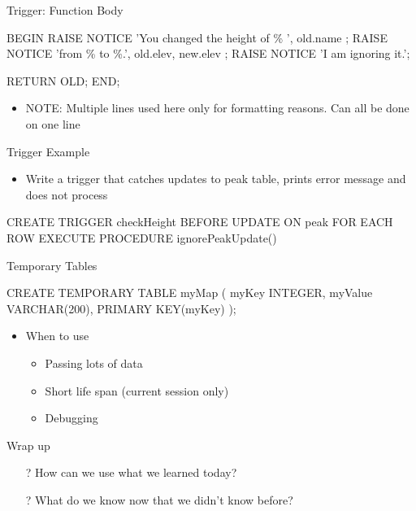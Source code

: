 \documentclass[aspectratio=169]{beamer}
\newenvironment{noindentitemize}
{ \begin{itemize}
 \setlength{\itemsep}{1.5ex}
  \setlength{\parsep}{0pt}   
  \setlength{\parskip}{0pt}
 \addtolength{\leftskip}{-2em}
 }
{ \end{itemize} }
\begin{document}

\begin{frame}[fragile]{Trigger: Function Body}


\begin{SQL}
BEGIN
   RAISE NOTICE 'You changed the height of \% ', old.name ;
   RAISE NOTICE 'from \% to \%.', old.elev, new.elev ;
   RAISE NOTICE 'I am ignoring it.';

   RETURN OLD;
END;
\end{SQL}

\begin{noindentitemize}
	\item NOTE: Multiple lines used here only for formatting reasons. Can all be done on one line
\end{noindentitemize}


\end{frame}


\begin{frame}[fragile]{Trigger Example}

\begin{noindentitemize}
	\item Write a trigger that catches updates to peak table, prints error message and does not process
\end{noindentitemize}

\begin{SQL}
CREATE TRIGGER checkHeight 
BEFORE UPDATE ON peak 
FOR EACH ROW
EXECUTE PROCEDURE ignorePeakUpdate()
\end{SQL}
\end{frame}


\begin{frame}[fragile]{Temporary Tables}

\begin{SQL}
CREATE TEMPORARY TABLE myMap (
  myKey INTEGER,
  myValue VARCHAR(200),
  PRIMARY KEY(myKey)
);
\end{SQL}

\begin{itemize}
	\item When to use 
	\begin{itemize}
		\item Passing lots of data
		\item Short life span (current session only)
		\item Debugging
	\end{itemize}
\end{itemize}
\end{frame}


\begin{frame}{Wrap up}
\begin{itemize}
	\item[?] How can we use what we learned today?
	\vspace{2em}
	\item[?] What do we know now that we didn't know before?
\end{itemize}
\end{frame}
\end{document}
